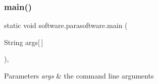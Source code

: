 \subsubsection{\texorpdfstring{main()}{main()}}
{\footnotesize\ttfamily static void software.\+parasoftware.\+main (\begin{DoxyParamCaption}\item[{String}]{args\mbox{[}$\,$\mbox{]} }\end{DoxyParamCaption})\hspace{0.3cm}{\ttfamily [inline]}, {\ttfamily [static]}}


\begin{DoxyParams}{Parameters}
{\em args} & the command line arguments \\
\hline
\end{DoxyParams}

